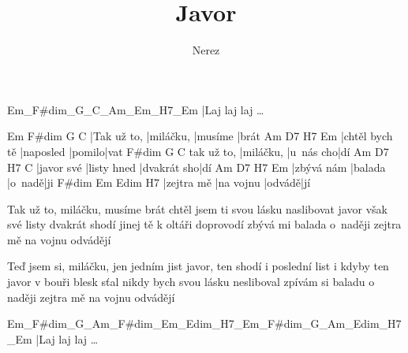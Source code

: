 \documentclass{song}
\author{Nerez}
\title{Javor}
\begin{document}
\strophe
Em_F#dim_G_C_Am_Em_H7_Em
|Laj laj laj \ldots
\endstrophe

\strophe
Em          F#dim     G       C
|Tak už to, |miláčku, |musíme |brát
Am             D7        H7    Em
|chtěl bych tě |naposled |pomilo|vat
           F#dim     G         C
tak už to, |miláčku, |u~nás cho|dí
Am         D7          H7          C
|javor své |listy hned |dvakrát sho|dí
Am         D7      H7     Em
|zbývá nám |balada |o~nadě|ji
F#dim      Em        Edim   H7
|zejtra mě |na vojnu |odvádě|jí
\endstrophe

\strophe*
Tak už to, miláčku, musíme brát
chtěl jsem ti svou lásku naslibovat
javor však své listy dvakrát shodí
jinej tě k oltáři doprovodí
zbývá mi balada o~naději
zejtra mě na vojnu odvádějí
\endstrophe

\strophe*
Teď jsem si, miláčku, jen jedním jist
javor, ten shodí i poslední list
i kdyby ten javor v bouři blesk sťal
nikdy bych svou lásku nesliboval
zpívám si baladu o naději
zejtra mě na vojnu odvádějí
\endstrophe

\strophe
Em_F#dim_G_Am_F#dim_Em_Edim_H7_Em_F#dim_G_Am_Edim_H7_Em
|Laj laj laj \ldots
\endstrophe
\end{document}
